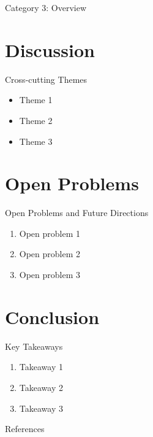 \documentclass[aspectratio=169]{beamer}
\begin{document}
\begin{frame}{Category 3: Overview}
\end{frame}

\section{Discussion}

\begin{frame}{Cross-cutting Themes}
\begin{itemize}
  \item Theme 1
  \item Theme 2
  \item Theme 3
\end{itemize}
\end{frame}

\section{Open Problems}

\begin{frame}{Open Problems and Future Directions}
\begin{enumerate}
  \item Open problem 1
  \item Open problem 2
  \item Open problem 3
\end{enumerate}
\end{frame}

\section{Conclusion}

\begin{frame}{Key Takeaways}
\begin{enumerate}
  \item Takeaway 1
  \item Takeaway 2
  \item Takeaway 3
\end{enumerate}
\end{frame}

\begin{frame}[allowframebreaks]{References}


\end{frame}
\end{document}
